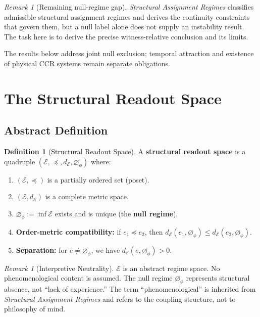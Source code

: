 \documentclass[11pt,a4paper]{article}
\theoremstyle{plain}
\theoremstyle{definition}
\newtheorem{definition}[theorem]{Definition}
\theoremstyle{remark}
\newtheorem{remark}[theorem]{Remark}
\newcommand{\E}{\mathcal{E}}
\newcommand{\dE}{d_{\mathcal{E}}}
\newcommand{\nullphi}{\varnothing_\phi}
\begin{document}
\begin{remark}[Remaining null-regime gap]\label{rem:null-prelim}
\textit{Structural Assignment Regimes} classifies admissible structural assignment regimes and derives the continuity constraints that govern them, but a null label alone does not supply an instability result. The task here is to derive the precise witness-relative conclusion and its limits.
\end{remark}

The results below address joint null exclusion; temporal attraction and existence of physical CCR systems remain separate obligations.

\section{The Structural Readout Space}

\subsection{Abstract Definition}

\begin{definition}[Structural Readout Space]\label{def:phenom}
A \textbf{structural readout space} is a quadruple $(\E, \preceq, \dE, \nullphi)$ where:
\begin{enumerate}
\item $(\E, \preceq)$ is a partially ordered set (poset).
\item $(\E, \dE)$ is a complete metric space.
\item $\nullphi := \inf \E$ exists and is unique (the \textbf{null regime}).
\item \textbf{Order-metric compatibility:} if $e_1 \preceq e_2$, then $\dE(e_1, \nullphi) \leq \dE(e_2, \nullphi)$.
\item \textbf{Separation:} for $e \neq \nullphi$, we have $\dE(e, \nullphi) > 0$.
\end{enumerate}
\end{definition}

\begin{remark}[Interpretive Neutrality]
$\E$ is an abstract regime space. No phenomenological content is assumed. The null regime $\nullphi$ represents structural absence, not ``lack of experience.'' The term ``phenomenological'' is inherited from \textit{Structural Assignment Regimes} and refers to the coupling structure, not to philosophy of mind.
\end{remark}
\end{document}

